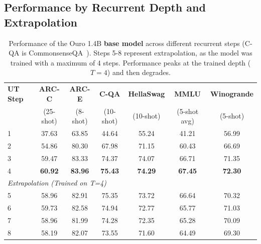 \documentclass[]{bytedance_seed}
\newcommand{\1}{\mathbf{1}}
\begin{document}
\subsection{Performance by Recurrent Depth and Extrapolation}
\begin{table}[htbp]
\centering
\small
\caption{Performance of the Ouro 1.4B \textbf{base model} across different recurrent steps (C-QA is CommonsenseQA~\cite{talmor-etal-2019-commonsenseqa}). Steps 5-8 represent extrapolation, as the model was trained with a maximum of 4 steps. Performance peaks at the trained depth ($T=4$) and then degrades.}
\label{tab:extrapolation_base_1_4b}
\begin{tabular}{lcccccc}
\toprule
\textbf{UT Step} & \textbf{ARC-C} & \textbf{ARC-E} & \textbf{C-QA} & \textbf{HellaSwag} & \textbf{MMLU} & \textbf{Winogrande} \\
& (25-shot) & (8-shot) & (10-shot) & (10-shot) & (5-shot avg) & (5-shot) \\
\midrule
1 & 37.63 & 63.85 & 44.64 & 55.24 & 41.21 & 56.99 \\
2 & 54.86 & 80.30 & 67.98 & 71.15 & 60.43 & 66.69 \\
3 & 59.47 & 83.33 & 74.37 & 74.07 & 66.71 & 71.35 \\
4 & \textbf{60.92} & \textbf{83.96} & \textbf{75.43} & \textbf{74.29} & \textbf{67.45} & \textbf{72.30} \\
\midrule[0.8pt]
\multicolumn{7}{l}{\textit{Extrapolation (Trained on T=4)}} \\
\midrule
5 & 58.96 & 82.91 & 75.35 & 73.72 & 66.64 & 70.32 \\
6 & 59.73 & 82.58 & 74.94 & 72.77 & 65.77 & 71.03 \\
7 & 58.96 & 81.99 & 74.28 & 72.35 & 65.28 & 70.09 \\
8 & 58.19 & 82.07 & 73.55 & 71.60 & 64.49 & 69.30 \\
\bottomrule
\end{tabular}
\end{table}
\end{document}
